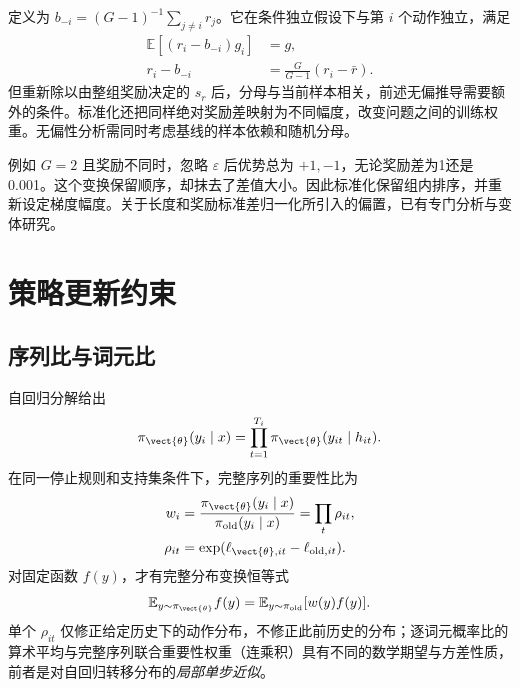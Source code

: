 \documentclass[../textbook.tex]{subfiles}
\begin{document}
定义为 $b_{-i}=(G-1)^{-1}\sum_{j\ne i}r_j$。它在条件独立假设下与第 $i$ 个动作独立，满足
\begin{equation}
\begin{aligned}
 \mathbb E[(r_i-b_{-i})g_i] &= g, \\
 r_i-b_{-i} &= \frac G{G-1}(r_i-\bar r).
\end{aligned}
\end{equation}
但重新除以由整组奖励决定的 $s_r$ 后，分母与当前样本相关，前述无偏推导需要额外的条件。标准化还把同样绝对奖励差映射为不同幅度，改变问题之间的训练权重。无偏性分析需同时考虑基线的样本依赖和随机分母。

例如 $G=2$ 且奖励不同时，忽略 $\varepsilon$ 后优势总为 $+1,-1$，无论奖励差为1还是0.001。这个变换保留顺序，却抹去了差值大小。因此标准化保留组内排序，并重新设定梯度幅度。关于长度和奖励标准差归一化所引入的偏置，已有专门分析与变体研究。\cite{liu2025r1critical}

\section{策略更新约束}

\subsection{序列比与词元比}
自回归分解给出
\begin{equation}
 \pi_{\vect{\theta}}(y_i\mid x)=\prod_{t=1}^{T_i}\pi_{\vect{\theta}}(y_{it}\mid h_{it}).
\end{equation}
在同一停止规则和支持集条件下，完整序列的重要性比为
\begin{equation}\label{eq:reason-ratio}
\begin{aligned}
 w_i &= \frac{\pi_{\vect{\theta}}(y_i\mid x)}{\pi_{\mathrm{old}}(y_i\mid x)} = \prod_t\rho_{it}, \\
 \rho_{it} &= \exp(\ell_{\vect{\theta},it}-\ell_{\mathrm{old},it}).
\end{aligned}
\end{equation}
对固定函数 $f(y)$，才有完整分布变换恒等式
\begin{equation}
 \mathbb E_{y\sim\pi_{\vect{\theta}}}f(y)
 =\mathbb E_{y\sim\pi_{\mathrm{old}}}[w(y)f(y)].
\end{equation}
单个 $\rho_{it}$ 仅修正给定历史下的动作分布，不修正此前历史的分布；逐词元概率比的算术平均与完整序列联合重要性权重（连乘积）具有不同的数学期望与方差性质，前者是对自回归转移分布的\emph{局部单步近似}。
\end{document}

